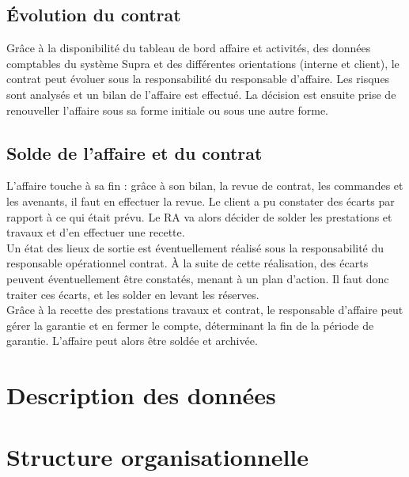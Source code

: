\subsection{Évolution du contrat}

Grâce à la disponibilité du tableau de bord affaire et activités, des données comptables du système Supra et des différentes orientations (interne et client), le contrat peut évoluer sous la responsabilité du responsable d'affaire. Les risques sont analysés et un bilan de l'affaire est effectué. La décision est ensuite prise de renouveller l'affaire sous sa forme initiale ou sous une autre forme.

\subsection{Solde de l'affaire et du contrat}

L'affaire touche à sa fin : grâce à son bilan, la revue de contrat, les commandes et les avenants, il faut en effectuer la revue. Le client a pu constater des écarts par rapport à ce qui était prévu. Le RA va alors décider de solder les prestations et travaux et d'en effectuer une recette. \\

Un état des lieux de sortie est éventuellement réalisé sous la responsabilité du responsable opérationnel contrat. À la suite de cette réalisation, des écarts peuvent éventuellement être constatés, menant à un plan d'action. Il faut donc traiter ces écarts, et les solder en levant les réserves. \\

Grâce à la recette des prestations travaux et contrat, le responsable d'affaire peut gérer la garantie et en fermer le compte, déterminant la fin de la période de garantie. L'affaire peut alors être soldée et archivée.

\section{Description des données}


\section{Structure organisationnelle}


